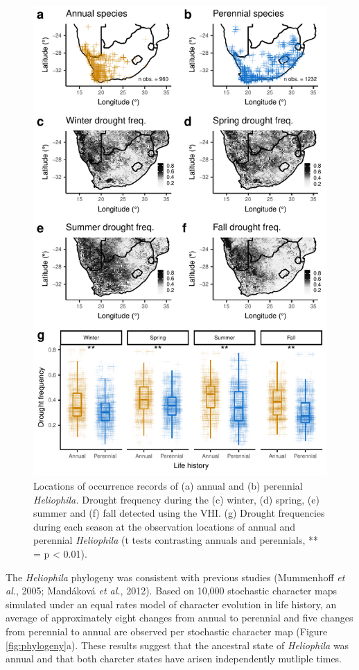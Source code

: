 \documentclass[man,floatsintext]{apa6}
\theoremstyle{definition}
\theoremstyle{definition}
\theoremstyle{definition}
\theoremstyle{remark}
\begin{document}
\begin{figure}[!h]
\includegraphics[width=\textwidth]{../figures/maps_boxplots} \caption{Locations of occurrence records of (a) annual and (b)
perennial \emph{Heliophila.} Drought frequency during the (c) winter,
(d) spring, (e) summer and (f) fall detected using the VHI. (g) Drought
frequencies during each season at the observation locations of annual
and perennial \emph{Heliophila} (t tests contrasting annuals and
perennials, ** = p \textless{} 0.01).}\label{fig:mapsboxplots}
\end{figure}

The \emph{Heliophila} phylogeny was consistent with previous studies
(Mummenhoff \emph{et al.}, 2005; Mandáková \emph{et al.}, 2012). Based
on 10,000 stochastic character maps simulated under an equal rates model
of character evolution in life history, an average of approximately
eight changes from annual to perennial and five changes from perennial
to annual are observed per stochastic character map (Figure
\ref{fig:phylogeny}a). These results suggest that the ancestral state of
\emph{Heliophila} was annual and that both charcter states have arisen
independently mutliple times.
\end{document}
